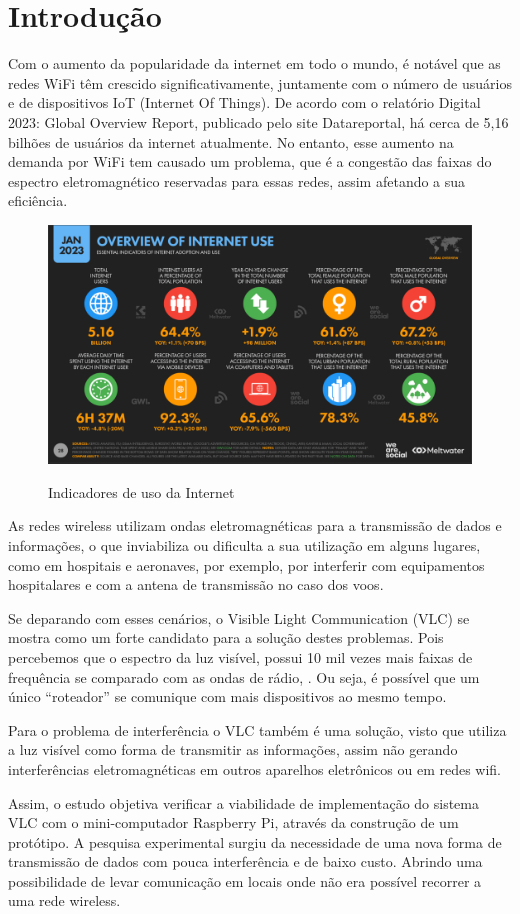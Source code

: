 \chapter{Introdução}

Com o aumento da popularidade da internet em todo o mundo, é notável que as redes WiFi têm crescido significativamente, juntamente com o número de usuários e de dispositivos IoT (Internet Of Things). De acordo com o relatório Digital 2023: Global Overview Report, publicado pelo site Datareportal, há cerca de 5,16 bilhões de usuários da internet atualmente. No entanto, esse aumento na demanda por WiFi tem causado um problema, que é a congestão das faixas do espectro eletromagnético reservadas para essas redes, assim afetando a sua eficiência.

\begin{figure}[htb]
  \centering
  \caption{Indicadores de uso da Internet}
  \includegraphics[scale=0.45]{images/internet_use.png}
  \label{figura:usoInternet}
\end{figure}

As redes  wireless utilizam ondas eletromagnéticas para a transmissão de dados e informações, o que inviabiliza ou dificulta a sua utilização em alguns lugares, como em hospitais e aeronaves, por exemplo, por interferir com equipamentos hospitalares e com a antena de transmissão no caso dos voos.

Se deparando com esses cenários, o Visible Light Communication (VLC) se mostra como um forte candidato para a solução destes problemas. Pois percebemos que o espectro da luz visível, possui 10 mil vezes mais faixas de frequência se comparado com as ondas de rádio, . Ou seja, é possível que um único “roteador” se comunique com mais dispositivos ao mesmo tempo.

Para o problema de interferência o VLC também é uma solução, visto que utiliza a luz visível como forma de transmitir as informações, assim não gerando interferências eletromagnéticas em outros aparelhos eletrônicos ou em redes wifi.

Assim, o estudo objetiva verificar a viabilidade de implementação do sistema VLC com o mini-computador Raspberry Pi, através da construção de um protótipo. A pesquisa experimental surgiu da necessidade de uma nova forma de transmissão de dados com pouca interferência e de baixo custo. Abrindo uma  possibilidade de levar comunicação em locais onde não era possível recorrer a uma rede wireless.

